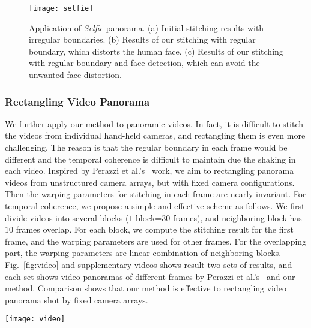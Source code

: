 \documentclass[10pt,journal,compsoc]{IEEEtran}
\begin{document}
 \begin{figure} %
  \centering
  \texttt{[image: selfie]}
  \caption{Application of \emph{Selfie} panorama. (a) Initial stitching results with irregular boundaries. (b) Results of our stitching with regular boundary, which distorts the human face. (c) Results of our stitching with regular boundary and face detection, which can avoid the unwanted face distortion. } \label{fig:selfie}
\end{figure}


\subsubsection{Rectangling Video Panorama}

We further apply our method to panoramic videos.
In fact, it is difficult to stitch the videos from individual hand-held cameras, and rectangling them is even more challenging.
The reason is that the regular boundary in each frame would be different and the temporal coherence is difficult to maintain due the shaking in each video.
Inspired by Perazzi et al.'s~\cite{journals/cgf/PerazziSZKWWG15} work, we aim to rectangling panorama videos from unstructured camera arrays, but with fixed camera configurations.
Then the warping parameters for stitching in each frame are nearly invariant.
For temporal coherence, we propose a simple and effective scheme as follows.
We first divide videos into several blocks ($1$ block=$30$ frames), and neighboring block has $10$ frames overlap.
For each block, we compute the stitching result for the first frame, and the warping parameters are used for other frames.
For the overlapping part, the warping parameters are linear combination of neighboring blocks.
Fig.~\ref{fig:video} and supplementary videos shows result two sets of results, and each set shows video panoramas of different frames by Perazzi et al.'s~\cite{journals/cgf/PerazziSZKWWG15} and our method. Comparison shows that our method is effective to rectangling video panorama shot by fixed camera arrays.

 \begin{figure*} %
  \centering
  \texttt{[image: video]}
  \caption{Application of rectangling video panorama. We give two examples, and each example shows stitching results of $4$ different frames using Perazzi et al.'s~\cite{journals/cgf/PerazziSZKWWG15} method and our rectangling respectively.} \label{fig:video}
\end{figure*}
\end{document}

